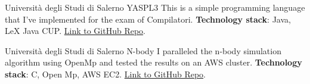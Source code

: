 \documentclass[%
               doublesided,
               paper=a4,
               fontsize=10pt
              ]{my-resume}
\begin{document}
{    
        {Università degli Studi di Salerno}
        {YASPL3}
        {This is a simple programming language that I've implemented for the exam of Compilatori. \textbf{Technology stack}: Java, LeX Java CUP. \href{https://github.com/CiccioTecchio/YASPL3}{Link to GitHub Repo}.}
    
        {Università degli Studi di Salerno}
        {N-body}
        {I paralleled the n-body simulation algorithm using OpenMp and tested the results on an AWS cluster. \textbf{Technology stack}: C, Open Mp, AWS EC2. \href{https://github.com/CiccioTecchio/n-Body_MPI}{Link to GitHub Repo}.}
        
    


    
    
}
\makebody
\clearpage
\end{document}
